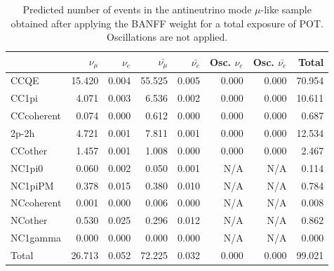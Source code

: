 
\begin{table}
\center
\begin{tabular} { | l ||r | r | r | r | r | r | | r | }
\hline
              & $\nu_\mu$            & $\nu_e$              & $\bar{\nu_\mu}$      & $\bar{\nu_e}$        & Osc. $\nu_e$         & Osc. $\bar{\nu_e}$   & Total                \\ \hline\hline
 CCQE         & 15.420               & 0.004                & 55.525               & 0.005                & 0.000                & 0.000                & 70.954               \\ \hline
 CC1pi        & 4.071                & 0.003                & 6.536                & 0.002                & 0.000                & 0.000                & 10.611               \\ \hline
 CCcoherent   & 0.074                & 0.000                & 0.612                & 0.000                & 0.000                & 0.000                & 0.687                \\ \hline
 2p-2h          & 4.721                & 0.001                & 7.811                & 0.001                & 0.000                & 0.000                & 12.534               \\ \hline
 CCother      & 1.457                & 0.001                & 1.008                & 0.000                & 0.000                & 0.000                & 2.467                \\ \hline
 NC1pi0       & 0.060                & 0.002                & 0.050                & 0.001                & N/A                  & N/A                  & 0.114                \\ \hline
 NC1piPM      & 0.378                & 0.015                & 0.380                & 0.010                & N/A                  & N/A                  & 0.784                \\ \hline
 NCcoherent   & 0.001                & 0.000                & 0.006                & 0.000                & N/A                  & N/A                  & 0.008                \\ \hline
 NCother      & 0.530                & 0.025                & 0.296                & 0.012                & N/A                  & N/A                  & 0.862                \\ \hline
 NC1gamma     & 0.000                & 0.000                & 0.000                & 0.000                & N/A                  & N/A                  & 0.000                \\ \hline
\hline
 Total        & 26.713               & 0.052                & 72.225               & 0.032                & 0.000                & 0.000                & 99.021               \\ \hline

\end{tabular}
\caption{
Predicted number of events in the antineutrino mode $\mu$-like sample
obtained after applying the BANFF weight
for a total exposure of \TotalPotNuBar{} POT.
Oscillations are not applied.
}
\label{tab:events_rhc1rmu_NoOsc}
\end{table}


